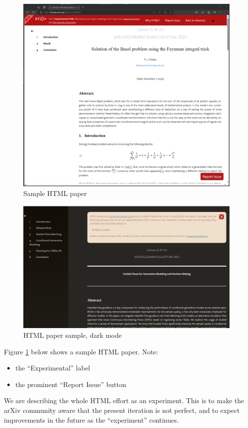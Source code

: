 \documentclass{easychair}
\begin{document}
\begin{figure}[t!]
    \centering
    \includegraphics[width=0.8\linewidth]{Sample-HTML-paper.png}
    \caption{Sample HTML paper}
    \label{fig:sample-html}
\end{figure}

\begin{figure}[b!]
    \centering
    \includegraphics[width=0.8\linewidth]{dark-mode.png}
    \caption{HTML paper sample, dark mode}
    \label{fig:dark-mode}
\end{figure}

Figure \ref{fig:sample-html} below shows a sample HTML paper. Note:
\begin{itemize}
    \item the ``Experimental'' label
    \item the prominent ``Report Issue'' button
\end{itemize}

We are describing the whole HTML effort as an experiment. This is to make the arXiv community aware that the present iteration is not perfect, and to expect improvements in the future as the ``experiment'' continues.
\end{document}
